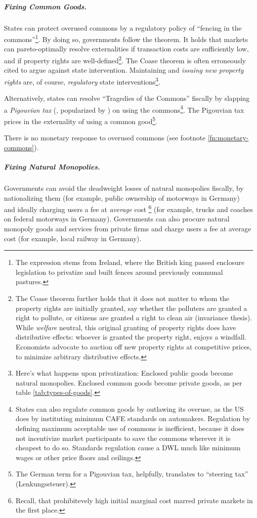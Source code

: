 \subparagraph{Fixing Common Goods.}  \label{sec:common-goodresponse} States can protect overused commons by a regulatory policy of ``fencing in the commons''\footnote{
	The expression stems from Ireland, where the British king passed enclosure legislation to privatize and built fences around previously communal pastures.}.
By doing so, governments follow the \cite{Coase1960} theorem. It holds that markets can pareto-optimally resolve externalities if transaction costs are sufficiently low, and if property rights are well-defined\footnote{
	The Coase theorem further holds that it does not matter to whom the property rights are initially granted, say whether the polluters are granted a right to pollute, or citizens are granted a right to clean air (invariance thesis). While \emph{welfare} neutral, this original granting of property rights does have distributive effects: whoever is granted the property right, enjoys a windfall. Economists advocate to auction off new property rights at competitive prices, to minimize arbitrary distributive effects.}.%
The Coase theorem is often erroneously cited to argue against state intervention. Maintaining and \emph{issuing new property rights} are, of course, \emph{regulatory} state interventions\footnote{
	Here's what happens upon privatization: Enclosed public goods become natural monopolies. Enclosed common goods become private goods, as per table \ref{tab:types-of-goods}.}.

Alternatively, states can resolve ``Tragedies of the Commons'' \citep{Hardin-1968-aa} fiscally by slapping a \emph{Pigouvian tax} (\citealt{Pigou1912}, popularized by \citealt{Baumol1972}) on using the commons\footnote{
	States can also regulate common goods by outlawing its overuse, as the US does by instituting minimum \gls{CAFE} standards on automakers. Regulation by defining maximum acceptable use of commons is inefficient, because it does not incentivize market participants to save the commons wherever it is cheapest to do so. Standards regulation cause a \gls{DWL} much like minimum wages or other price floors and ceilings.}.
The Pigouvian tax prices in the externality of using a common good\footnote{
	The German term for a Pigouvian tax, helpfully, translates to ``steering tax'' (Lenkungssteuer).}.

There is no monetary response to overused commons (see footnote \ref{fn:monetary-commons}).

\subparagraph{Fixing Natural Monopolies.}  \label{sec:natural-monopoly-response} Governments can avoid the deadweight losses of natural monopolies fiscally, by nationalizing them (for example, public ownership of motorways in Germany) and ideally charging users a fee at \emph{average} cost
\footnote{
\label{fn:why-ac-fees}
	Recall, that prohibitevely high initial marginal cost marred private markets in the first place.
}
(for example, trucks and coaches on federal motorways in Germany). Governments can also procure natural monopoly goods and services from private firms and charge users a fee at average cost (for example, local railway in Germany).

